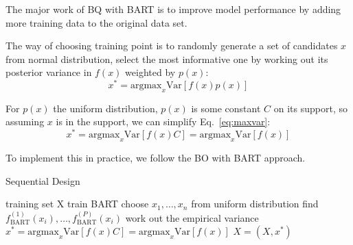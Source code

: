The major work of BQ with BART is to improve model performance by adding more training data to the original data set.

The way of choosing training point is to randomly generate a set of candidates $x$ from normal distribution, select the most informative one by working out its posterior variance in $f(x)$ weighted by $p(x)$:
\begin{equation}
	x^* = \mbox{argmax}_x \mbox{Var}[f(x)p(x)]
	\label{eq:maxvar}
\end{equation}

For $p(x)$ the uniform distribution, $p(x)$ is some constant $C$ on its support, so assuming $x$ is in the support, we can simplify Eq.~\eqref{eq:maxvar}:
\begin{equation}
	x^* = \mbox{argmax}_{x} \mbox{Var}[f(x)C] = \mbox{argmax}_{x} \mbox{Var}[f(x)]
	\label{eq:maxvar}
\end{equation}

To implement this in practice, we follow the BO with BART approach.

\begin{algorithm}[]
  \caption{Sequential Design}
  \label{alg:SQ}
\begin{algorithmic}
   training set X
  \STATE train BART
  \STATE choose $x_1, \ldots, x_n$ from uniform distribution
  \STATE find $f_{\mbox{BART}}^{(1)}(x_i), \ldots, f_{\mbox{BART}}^{(P)}(x_i)$ 
  \STATE work out the empirical variance
  \ENDFOR
  \STATE $x^* = \mbox{argmax}_{x} \mbox{Var}[f(x)C] = \mbox{argmax}_{x} \mbox{Var}[f(x)]
	\label{eq:maxvar}$
  \STATE $X = (X, x^*)$
  \REPEAT
\end{algorithmic}
\end{algorithm}


